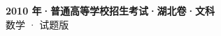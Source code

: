 \documentclass[zihao=-4, a4paper]{ctexart}
\begin{document}
\begin{center}
  {\Large\bfseries 2010 年·普通高等学校招生考试·湖北卷·文科}\\[4pt]
  {\large 数学 · 试题版}
\end{center}
\medskip
{}

\end{document}
